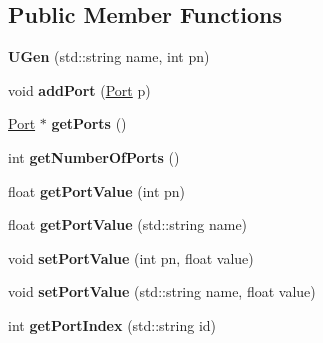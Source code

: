 \subsection*{Public Member Functions}
\begin{DoxyCompactItemize}
\item 
\hypertarget{classunit_1_1UGen_af2d6d70e1340c9853a9a329cb2db164a}{{\bfseries U\-Gen} (std\-::string name, int pn)}\label{classunit_1_1UGen_af2d6d70e1340c9853a9a329cb2db164a}

\item 
\hypertarget{classunit_1_1UGen_a7d5be76c0847cea2ffd9fb6118dad84b}{void {\bfseries add\-Port} (\hyperlink{classPort}{Port} p)}\label{classunit_1_1UGen_a7d5be76c0847cea2ffd9fb6118dad84b}

\item 
\hypertarget{classunit_1_1UGen_a2dbed70294dba960bebb4e6e6196f93f}{\hyperlink{classPort}{Port} $\ast$ {\bfseries get\-Ports} ()}\label{classunit_1_1UGen_a2dbed70294dba960bebb4e6e6196f93f}

\item 
\hypertarget{classunit_1_1UGen_a1f7c0151b63c89a92ea7b3b598969fb5}{int {\bfseries get\-Number\-Of\-Ports} ()}\label{classunit_1_1UGen_a1f7c0151b63c89a92ea7b3b598969fb5}

\item 
\hypertarget{classunit_1_1UGen_a5790d6f5f741d9286e12f27eafd86bd5}{float {\bfseries get\-Port\-Value} (int pn)}\label{classunit_1_1UGen_a5790d6f5f741d9286e12f27eafd86bd5}

\item 
\hypertarget{classunit_1_1UGen_a2a33803a853db61cc79cc6da90ce511d}{float {\bfseries get\-Port\-Value} (std\-::string name)}\label{classunit_1_1UGen_a2a33803a853db61cc79cc6da90ce511d}

\item 
\hypertarget{classunit_1_1UGen_ae933825c4201f13cb481d399de1bd4d5}{void {\bfseries set\-Port\-Value} (int pn, float value)}\label{classunit_1_1UGen_ae933825c4201f13cb481d399de1bd4d5}

\item 
\hypertarget{classunit_1_1UGen_a1ed212c207052705c9fbd2fb64fe1092}{void {\bfseries set\-Port\-Value} (std\-::string name, float value)}\label{classunit_1_1UGen_a1ed212c207052705c9fbd2fb64fe1092}

\item 
\hypertarget{classunit_1_1UGen_a7caac30e931fe2e39c53be9a084e2709}{int {\bfseries get\-Port\-Index} (std\-::string id)}\label{classunit_1_1UGen_a7caac30e931fe2e39c53be9a084e2709}


\end{DoxyCompactItemize}
